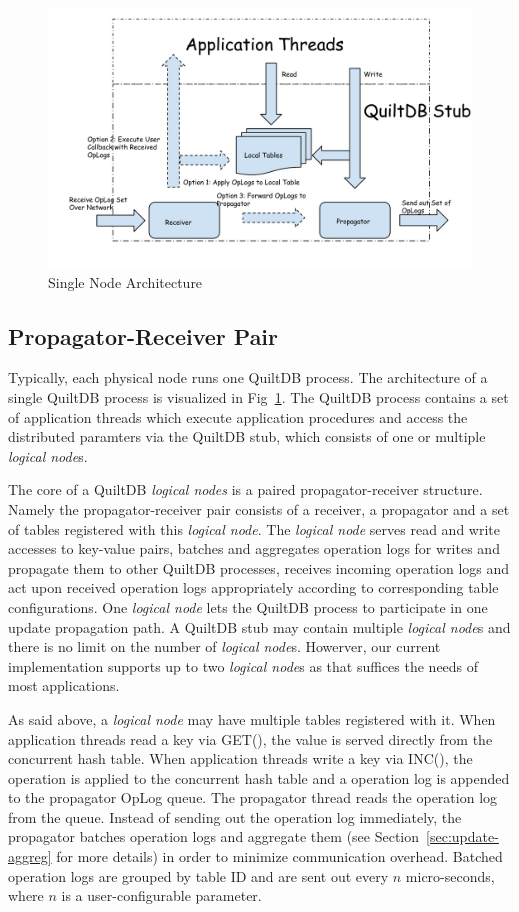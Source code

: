 \documentclass{acm_proc_article-sp}
\begin{document}
\begin{figure}[th!]
  \centering
  \includegraphics[width=.5\textwidth]{fig/propagator-receiver.pdf}
  \caption{Single Node Architecture}
  \label{fig:prop-recv}
\end{figure}

\subsection{Propagator-Receiver Pair}

Typically, each physical node runs one QuiltDB process. The architecture of a single 
QuiltDB process is visualized in Fig~\ref{fig:prop-recv}.  The QuiltDB process
contains a set of application threads which execute application procedures and 
access the distributed paramters via the QuiltDB stub, which consists of one 
or multiple \emph{logical node}s.

The core of a QuiltDB \emph{logical nodes} is a paired propagator-receiver 
structure. Namely the propagator-receiver pair consists
of a receiver, a propagator and a set of tables registered with this 
\emph{logical node}. The \emph{logical node} serves read and write accesses to 
key-value pairs, batches and aggregates operation logs for writes and propagate 
them to other QuiltDB processes, receives incoming operation logs and act upon 
received operation logs appropriately according to corresponding table 
configurations. One \emph{logical node} lets the QuiltDB process to participate 
in one update propagation path. A QuiltDB stub may contain multiple 
\emph{logical node}s and there is no limit on the number of \emph{logical 
node}s. Howerver, our current implementation supports up to two \emph{logical 
node}s as that suffices the needs of most applications.

As said above, a \emph{logical node} may have multiple tables registered with it.
When application threads read a key via GET(), the value is served directly from
the concurrent hash table. When application threads write a key via INC(), the
operation is applied to the concurrent hash table and a operation log is
appended to the propagator OpLog queue. The propagator thread reads the
operation log from the queue. Instead of sending out the operation log
immediately, the propagator batches operation logs and aggregate them (see
Section~\ref{sec:update-aggreg} for more details) in order to minimize
communication overhead. Batched operation logs are grouped by table ID and are
sent out every $n$ micro-seconds, where $n$ is a user-configurable parameter.
\end{document}
